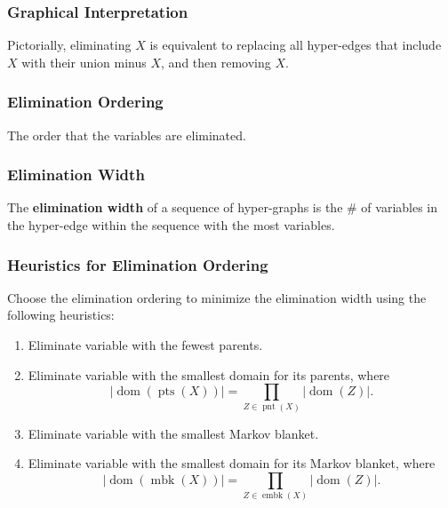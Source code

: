 \subsubsection{Graphical Interpretation}
\begin{notes}
    Pictorially, eliminating $X$ is equivalent to replacing all hyper-edges that include $X$ with their union minus $X$, and then removing $X$.
\end{notes}

\subsubsection{Elimination Ordering}
\begin{definition}
    The order that the variables are eliminated.
\end{definition}

\subsubsection{Elimination Width}
\begin{definition}
    The \textbf{elimination width} of a sequence of hyper-graphs is the \# of variables in the hyper-edge within the sequence with the most variables.
\end{definition}

\subsubsection{Heuristics for Elimination Ordering}
\begin{definition}
    Choose the elimination ordering to minimize the elimination width using the following heuristics:
    \begin{enumerate}
        \item Eliminate variable with the fewest parents.
        \item Eliminate variable with the smallest domain for its parents, where
        \[
        |\operatorname{dom}(\operatorname{pts}(X))| = \prod_{Z \in \operatorname{pnt}(X)} |\operatorname{dom}(Z)|.
        \]
        \item Eliminate variable with the smallest Markov blanket.
        \item Eliminate variable with the smallest domain for its Markov blanket, where
        \[
        |\operatorname{dom}(\operatorname{mbk}(X))| = \prod_{Z \in \operatorname{embk}(X)} |\operatorname{dom}(Z)|.
        \]
    \end{enumerate}
\end{definition}
\newpage


